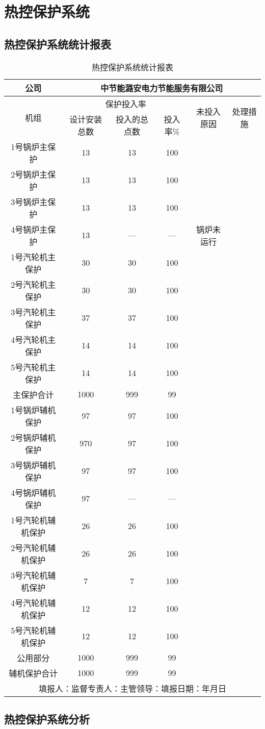 \documentclass[UTF8]{ctexart}
\begin{document}
\section{热控保护系统}
\subsection{热控保护系统统计报表}
\begin{table}[htbp]
	\centering
	\caption{热控保护系统统计报表}
\begin{tabular}{|c|c|c|c|c|c|}
\hline
	公司 & \multicolumn{5}{|c|}{中节能潞安电力节能服务有限公司}\tabularnewline
\hline
	\multirow{2}{*}{机组} & \multicolumn{3}{|c|}{保护投入率\footnotemark} & \multirow{2}{*}{未投入原因} & \multirow{2}{*}{处理措施}\tabularnewline
	\cline{2-4}&设计安装总数&投入的总点数&投入率\%&&\tabularnewline
\hline
	1号锅炉主保护&13&13&100&&\tabularnewline  
\hline
	2号锅炉主保护&13&13&100&&\tabularnewline  
\hline
	3号锅炉主保护&13&13&100&&\tabularnewline  
\hline
	4号锅炉主保护&13&---&---&锅炉未运行&\tabularnewline  
\hline
	1号汽轮机主保护&30&30&100&&\tabularnewline  
\hline
	2号汽轮机主保护&30&30&100&&\tabularnewline  
\hline
	3号汽轮机主保护&37&37&100&&\tabularnewline  
\hline
	4号汽轮机主保护&14&14&100&&\tabularnewline  
\hline
	5号汽轮机主保护&14&14&100&&\tabularnewline  
\hline
	主保护合计&1000&999&99&&\tabularnewline  
\hline
	1号锅炉辅机保护& 97&97&100&&\tabularnewline  
\hline
	2号锅炉辅机保护&970&97&100&&\tabularnewline  
\hline
	3号锅炉辅机保护&97&97&100&&\tabularnewline  
\hline
	4号锅炉辅机保护&97&---&---&&\tabularnewline  
\hline
	1号汽轮机辅机保护&26&26&100&&\tabularnewline  
\hline
	2号汽轮机辅机保护&26&26&100&&\tabularnewline  
\hline
	3号汽轮机辅机保护&7&7&100&&\tabularnewline  
\hline
	4号汽轮机辅机保护&12&12&100&&\tabularnewline  
\hline
	5号汽轮机辅机保护&12&12&100&&\tabularnewline  
\hline
	公用部分&1000&999&99&&\tabularnewline  
\hline
	辅机保护合计&1000&999&99&&\tabularnewline  
\hline
	\multicolumn{6}{|c|}{\noindent 填报人：\hspace*{0.1\textwidth}监督专责人：\hspace*{0.1\textwidth}主管领导：\hspace*{0.1\textwidth}填报日期：\hspace{2em}年\hspace{1.5em}月\hspace{1.5em}日\hspace{1.5em}}\tabularnewline
\hline
\end{tabular}
\end{table}
\subsection{热控保护系统分析}
\clearpage
\end{document}
